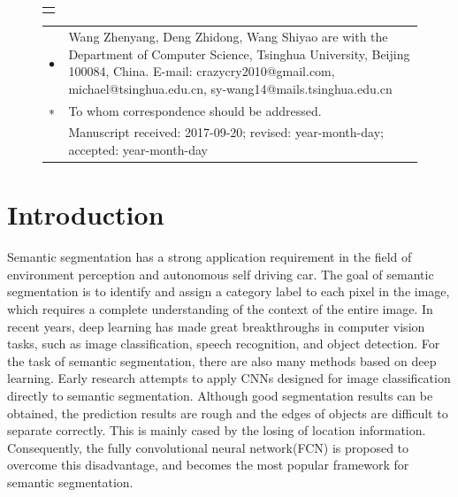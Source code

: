 \documentclass[10.5pt,compsoc]{TsT}
\newcommand{\upcite}[1]{\superscript{\textsuperscript{\cite{#1}}}}
\theoremstyle{mystyle}
\newcommand{\upcite}[1]{\textsuperscript{\cite{#1}}}
\begin{document}
{\begin{strip}
{\begin{tabular}{p{160mm}}
\end{tabular}
}
\vskip 6mm

\vskip -3mm
\end{strip}


\thispagestyle{plain}%
\thispagestyle{empty}%
\makeatother
\pagestyle{tstheadings}

\begin{figure}[b]
\vskip -6mm
\begin{tabular}{p{44mm}}
\toprule\\
\end{tabular}
\vskip -4.5mm
\noindent
\setlength{\tabcolsep}{1pt}
\begin{tabular}{p{1.5mm}p{79.5mm}}
$\bullet$& Wang Zhenyang, Deng Zhidong, Wang Shiyao are with the Department of Computer Science, Tsinghua University, Beijing 100084, China. E-mail: crazycry2010@gmail.com, michael@tsinghua.edu.cn, sy-wang14@mails.tsinghua.edu.cn \\
$\sf{*}$&
To whom correspondence should be addressed. \\
          &          Manuscript received: 2017-09-20; revised: year-month-day; accepted: year-month-day

\end{tabular}
\end{figure}



\section{Introduction}
\label{s:introduction}
\noindent

Semantic segmentation has a strong application requirement in the field of environment perception and autonomous self driving car. The goal of semantic segmentation is to identify and assign a category label to each pixel in the image, which requires a complete understanding of the context of the entire image. In recent years, deep learning has made great breakthroughs in computer vision tasks, such as image classification\upcite{1}, speech recognition\upcite{2}, and object detection\upcite{3}. For the task of semantic segmentation, there are also many methods based on deep learning. Early research attempts to apply CNNs designed for image classification directly to semantic segmentation. Although good segmentation results can be obtained, the prediction results are rough and the edges of objects are difficult to separate correctly. This is mainly cased by the losing of location information. Consequently, the fully convolutional neural network(FCN)\upcite{4} is proposed to overcome this disadvantage, and becomes the most popular framework for semantic segmentation.

}
\end{document}
